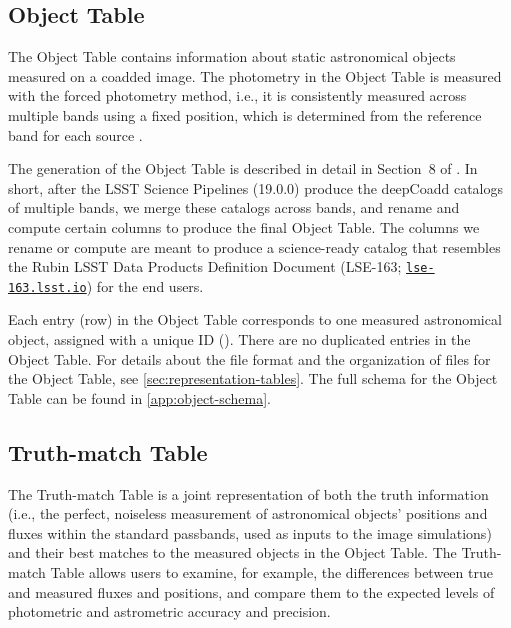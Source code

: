\documentclass[modern]{descnote}
\newcommand*{\https}[1]{\href{https://#1}{\nolinkurl{#1}}}
\begin{document}
\subsection{Object Table}
\label{sec:object}

The Object Table contains information about static astronomical objects measured on a coadded image. The photometry in the Object Table is measured with the forced photometry method, i.e., it is consistently measured across multiple bands using a fixed position, which is determined from the reference band for each source \citep[Section~3.4 of][]{10.1093/pasj/psx080}. 

The generation of the Object Table is described in detail in Section~8 of \cite{2020arXiv201005926L}. In short, after the LSST Science Pipelines (19.0.0) produce the deepCoadd catalogs of multiple bands, we merge these catalogs across bands, and rename and compute certain columns to produce the final Object Table. The columns we rename or compute are meant to produce a science-ready catalog that resembles the Rubin LSST Data Products Definition Document (LSE-163; \https{lse-163.lsst.io}) for the end users. 

Each entry (row) in the Object Table corresponds to one measured astronomical object, assigned with a unique ID (). There are no duplicated entries in the Object Table. For details about the file format and the organization of files for the Object Table, see \autoref{sec:representation-tables}. The full schema for the Object Table can be found in \autoref{app:object-schema}. 

\subsection{Truth-match Table}
\label{sec:truth}

The Truth-match Table is a joint representation of both the truth information (i.e., the perfect, noiseless measurement of astronomical objects' positions and fluxes within the standard passbands, used as inputs to the image simulations) and their best matches to the measured objects in the Object Table. The Truth-match Table allows users to examine, for example, the differences between true and measured fluxes and positions, and compare them to the expected levels of photometric and astrometric accuracy and precision.
\end{document}
